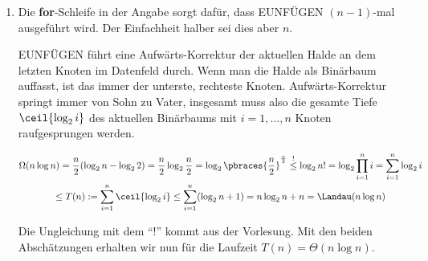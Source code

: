 \begin{solution}
\begin{enumerate}[label = \alph*]
\begin{center}

    \end{center}

    \item Die \textbf{for}-Schleife in der Angabe sorgt dafür, dass EUNFÜGEN $(n-1)$-mal ausgeführt wird.
    Der Einfachheit halber sei dies aber $n$.

    EUNFÜGEN führt eine Aufwärts-Korrektur der aktuellen Halde an dem letzten Knoten im Datenfeld durch.
    Wenn man die Halde als Binärbaum auffasst, ist das immer der unterste, rechteste Knoten.
    Aufwärts-Korrektur springt immer von Sohn zu Vater, insgesamt muss also die gesamte Tiefe $\ceil{\log_2 i}$ des aktuellen Binärbaums mit $i = 1, \dots, n$ Knoten raufgesprungen werden.

    \begin{multline*}
        \Omega(n \log n)
        =
        \frac{n}{2} (\log_2 n - \log_2 2)
        =
        \frac{n}{2} \log_2 \frac{n}{2}
        =
        \log_2 \pbraces{\frac{n}{2}}^\frac{n}{2}
        \stackrel{!}{\leq}
        \log_2 n!
        =
        \log_2 \prod_{i=1}^n i
        =
        \sum_{i=1}^n \log_2 i \\
        \leq
        T(n)
        :=
        \sum_{i=1}^n \ceil{\log_2 i}
        \leq
        \sum_{i=1}^n (\log_2 n + 1)
        =
        n \log_2 n + n
        =
        \Landau(n \log n)
    \end{multline*}

    Die Ungleichung mit dem \enquote{!} kommt aus der Vorlesung.
    Mit den beiden Abschätzungen erhalten wir nun für die Laufzeit $T(n) = \Theta(n \log n)$.

\end{enumerate}

\end{solution}
